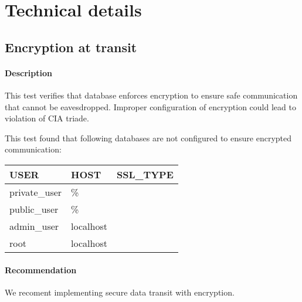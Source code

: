 \section{Technical details}
\subsection{Encryption at transit}
\paragraph{Description} This test verifies that database enforces encryption to ensure safe communication that cannot be eavesdropped. Improper configuration of encryption could lead to violation of CIA triade.

This test found that following databases are not configured to ensure encrypted communication:
\begin{center}
\begin{tabular}{|l|l|l|}
\hline
\textbf{USER} & \textbf{HOST} & \textbf{SSL\_TYPE} \\ \hline
private\_user & \% &   \\ \hline
public\_user & \% &   \\ \hline
admin\_user & localhost &   \\ \hline
root & localhost &   \\ \hline
\end{tabular}
\end{center}
\paragraph{Recommendation} We recoment implementing secure data transit with encryption.
